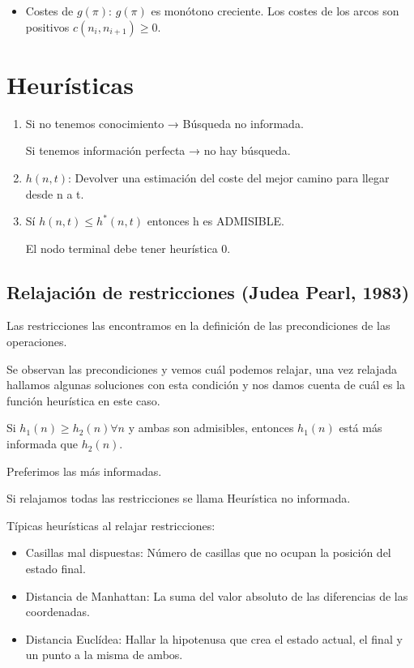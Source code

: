 \documentclass[12pt, twoside, openright]{report} %
\begin{document}
\begin{itemize}
	\item Costes de \(g(\pi)\): \(g(\pi)\) es monótono creciente. Los costes
	      de los arcos son positivos \(c(n_i,n_{i+1}) \geq 0\).
\end{itemize}


\section{Heurísticas}

\begin{enumerate}
	\def\labelenumi{\arabic{enumi}.}
	\item Si no tenemos conocimiento → Búsqueda no informada.

	      Si tenemos información perfecta → no hay búsqueda.
	\item \(h(n,t)\): Devolver una estimación del coste del mejor camino para
	      llegar desde n a t.
	\item Sí \(h(n,t) \leq h^*(n,t)\) entonces h es ADMISIBLE.

	      El nodo terminal debe tener heurística 0.
\end{enumerate}

\subsection{Relajación de restricciones (Judea Pearl, 1983)}



Las restricciones las encontramos en la definición de las
precondiciones de las operaciones.

Se observan las precondiciones y vemos cuál podemos relajar, una vez
relajada hallamos algunas soluciones con esta condición y nos damos
cuenta de cuál es la función heurística en este caso.

Si \(h_1(n)\geq h_2(n) \forall n\) y ambas son admisibles, entonces
\(h_1(n)\) está más informada que \(h_2(n)\).

Preferimos las más informadas.

Si relajamos todas las restricciones se llama Heurística no
informada.

Típicas heurísticas al relajar restricciones:

\begin{itemize}
	\item Casillas mal dispuestas: Número de casillas que no ocupan la
	      posición del estado final.
	\item Distancia de Manhattan: La suma del valor absoluto de las
	      diferencias de las coordenadas.
	\item Distancia Euclídea: Hallar la hipotenusa que crea el estado
	      actual, el final y un punto a la misma de ambos.
\end{itemize}
\pagebreak
\end{document}
